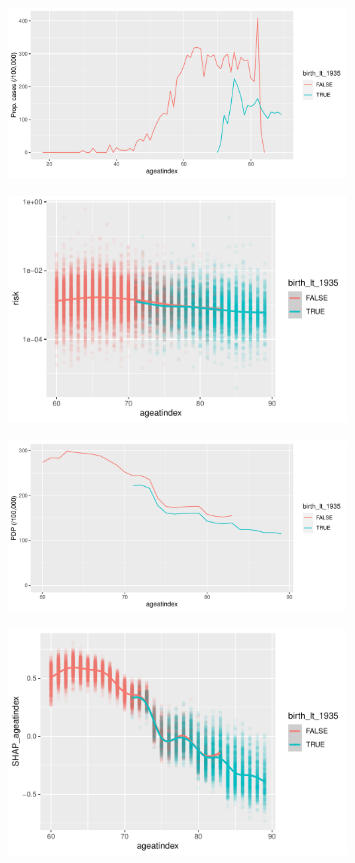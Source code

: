 \documentclass[12pt]{article}
\begin{document}
\begin{figure}[h]
\centering
\includegraphics[width=0.8\textwidth]{figures/prop_cases_age_birth.pdf}
\end{figure}

\begin{figure}[h]
\centering
\includegraphics[width=0.8\textwidth]{figures/risk_age_birth.pdf}
\end{figure}
\begin{figure}[h]
\centering
\includegraphics[width=0.8\textwidth]{figures/age_pdp.pdf}
\end{figure}
\begin{figure}[h]
\centering
\includegraphics[width=0.8\textwidth]{figures/shape_age_birth.pdf}
\end{figure}
\end{document}
